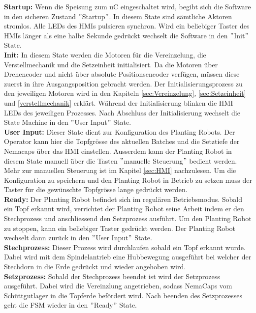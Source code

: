 \textbf{Startup:} Wenn die Speisung zum uC eingeschaltet wird, begibt sich die Software in den sicheren Zustand $"$Startup$"$. In diesem State sind sämtliche Aktoren stromlos. Alle LEDs des HMIs pulsieren synchron. Wird ein beliebiger Taster des HMIs länger als eine halbe Sekunde gedrückt wechselt die Software in den $"$Init$"$ State.\\
\newline
\textbf{Init:} In diesem State werden die Motoren für die Vereinzelung, die Verstellmechanik und die Setzeinheit initialisiert. Da die Motoren über Drehencoder und nicht über absolute Positionsencoder verfügen, müssen diese zuerst in ihre Ausgangsposition gebracht werden. Der Initialisierungsprozess zu den jeweiligen Motoren wird in den Kapiteln \ref{sec:Vereinzelung}, \ref{sec:Setzeinheit} und \ref{verstellmechanik} erklärt. Während der Initialisierung blinken die HMI LEDs des jeweiligen Prozesses. Nach Abschluss der Initialisierung wechselt die State Machine in den $"$User Input$"$ State.\\
\newline
\textbf{User Input:} Dieser State dient zur Konfiguration des Planting Robots. Der Operator kann hier die Topfgrösse des aktuellen Batches und die Setztiefe der Nemacaps über das HMI einstellen. Ausserdem kann der Planting Robot in diesem State manuell über die Tasten $"$manuelle Steuerung$"$ bedient werden. Mehr zur manuellen Steuerung ist im Kapitel \ref{sec:HMI} nachzulesen. Um die Konfiguration zu speichern und den Planting Robot in Betrieb zu setzen muss der Taster für die gewünschte Topfgrösse lange gedrückt werden.\\
\newline
\textbf{Ready:} Der Planting Robot befindet sich im regulären Betriebsmodus. Sobald ein Topf erkannt wird, verrichtet der Planting Robot seine Arbeit indem er den Stechprozess und anschliessend den Setzprozess ausführt. Um den Planting Robot zu stoppen, kann ein beliebiger Taster gedrückt werden. Der Planting Robot wechselt dann zurück in den $"$User Input$"$ State.\\
\newline
\textbf{Stechprozess:} Dieser Prozess wird durchlaufen sobald ein Topf erkannt wurde. Dabei wird mit dem Spindelantrieb eine Hubbewegung ausgeführt bei welcher der Stechdorn in die Erde gedrückt und wieder angehoben wird.\\
\newline
\textbf{Setzprozess:} Sobald der Stechprozess beendet ist wird der Setzprozess ausgeführt. Dabei wird die Vereinzlung angetrieben, sodass NemaCaps vom Schüttgutlager in die Topferde befördert wird. Nach beenden des Setzprozesses geht die FSM wieder in den $"$Ready$"$ State.

